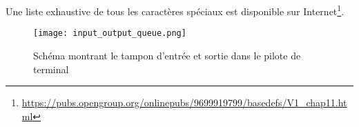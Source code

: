 Une liste exhaustive de tous les caractères spéciaux est disponible sur Internet\footnote{\url{https://pubs.opengroup.org/onlinepubs/9699919799/basedefs/V1_chap11.html}}.

\begin{figure}[h]
	\centering
	\texttt{[image: input\_output\_queue.png]}
	\caption{Schéma montrant le tampon d'entrée et sortie dans le pilote de terminal}
\end{figure}

